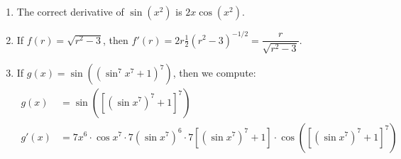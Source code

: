 \begin{exs}\leavevmode
  \begin{enumerate}
    \item The correct derivative of $ \sin(x^2) $ is $ 2x \cos(x^2) $.
    \item If $ f(r) = \sqrt{r^2 - 3} $, then $ f'(r) = 2r \frac{1}{2} \left(r^2 - 3\right)^{-1/2} = \dfrac{r}{\sqrt{r^2 - 3}} $.
    \item If $ g(x) = \sin((\sin^7 x^7 + 1)^7) $, then we compute:
          \begin{align*}
            g(x)  &= \sin \left( \left[ \left( \sin x^7 \right)^7 + 1 \right]^7 \right)\\
            g'(x) &= 7x^6 \cdot \cos x^7 \cdot 7\left(\sin x^7\right)^6 \cdot 7\left[\left(\sin x^7\right)^7 + 1\right]
                          \cdot \cos \left( \left[ \left( \sin x^7 \right)^7 + 1 \right]^7 \right)
          \end{align*}
  \end{enumerate}
\end{exs}

%
%

